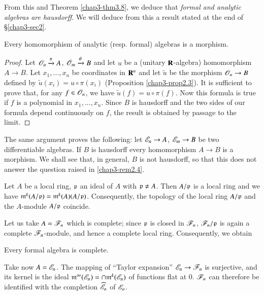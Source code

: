 From this and Theorem \ref{chap3-thm3.8}, we deduce that {\em formal and analytic algebras are hausdorff}. We will deduce from this a result stated at the end of \S\ref{chap3-sec2}.

\begin{proposition}\label{chap3-prop3.14}
Every homomorphism of analytic (resp. formal) algebras is a morphism.
\end{proposition}

\begin{proof}
Let $\mathscr{O}_{n}\xrightarrow{\pi}A$, $\mathscr{O}_{m}\xrightarrow{\psi}B$ and let $u$ be a (unitary $\mathbf{R}$-algebra) homomorphism $A\to B$. Let $x_{1},\ldots,x_{n}$ be coordinates in $\mathbf{R}^{n}$ and let $\widetilde{u}$ be the morphism $\mathscr{O}_{n}\to B$ defined by $\widetilde{u}(x_{i})=u\circ \pi(x_{i})$ (Proposition \ref{chap3-prop2.3}). It is sufficient to prove that, for any $f\in \mathscr{O}_{n}$, we have $\widetilde{u}(f)=u\circ \pi(f)$. Now this formula is true if $f$ is a polynomial in $x_{1},\ldots,x_{n}$. Since $B$ is hausdorff and the two sides of our formula depend continuously on $f$, the result is obtained by passage to the limit.
\end{proof}

\begin{remark}\label{chap3-rem3.15}
The same argument proves the following: let $\mathscr{E}_{n}\to A$, $\mathscr{E}_{m}\to B$ be two differentiable algebras. If $B$ is hausdorff every homomorphism $A\to B$ is a morphism. We shall see that, in general, $B$ is not hausdorff, so that this does not answer the question raised in \ref{chap3-rem2.4}.
\end{remark}

Let $A$ be a local ring, $\mathfrak{p}$ an ideal of $A$ with $\mathfrak{p}\neq A$. Then $A/\mathfrak{p}$ is a local ring and we have $\mathfrak{m}^{k}(A/\mathfrak{p})=\mathfrak{m}^{k}(A)(A/\mathfrak{p})$. Consequently, the topology of the local ring $A/\mathfrak{p}$ and the $A$-module $A/\mathfrak{p}$ coincide.

Let us take $A=\mathscr{F}_{n}$ which is complete; since $\mathfrak{p}$ is closed in $\mathscr{F}_{n}$, $\mathscr{F}_{n}/\mathfrak{p}$ is again a complete $\mathscr{F}_{n}$-module, and hence a complete local ring. Consequently, we obtain

\begin{proposition}\label{chap3-prop3.16}
Every formal algebra is complete.
\end{proposition}

Take now $A=\mathscr{E}_{n}$. The mapping of ``Taylor expansion'' $\mathscr{E}_{n}\to \mathscr{F}_{n}$ is surjective, and its kernel is the ideal $\mathfrak{m}^{\infty}(\mathscr{E}_{n})=\cap \mathfrak{m}^{k}(\mathscr{E}_{n})$ of functions flat at $0$. $\mathscr{F}_{n}$ can therefore be identified with the completion $\widehat{\mathscr{E}}_{n}$ of $\mathscr{E}_{n}$.

